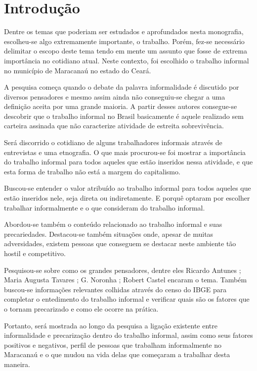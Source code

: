 \chapter{Introdução}

Dentre os temas que poderiam ser estudados e aprofundados nesta monografia, escolheu-se algo extremamente importante, o trabalho. Porém, fez-se necessário delimitar o escopo deste tema tendo em mente um assunto que fosse de extrema importância no cotidiano atual. Neste contexto, foi escolhido o trabalho informal no município de Maracanaú no estado do Ceará.

A pesquisa começa quando o debate da palavra informalidade é discutido por diversos pensadores e mesmo assim ainda não conseguiu-se chegar a uma definição aceita por uma grande maioria. A partir desses autores consegue-se descobrir que o trabalho informal no Brasil basicamente é aquele realizado sem carteira assinada que não caracterize atividade de estreita sobrevivência.

Será discorrido o cotidiano de alguns trabalhadores informais através de entrevistas e uma etnografia. O que mais procurou-se foi mostrar a importância do trabalho informal para todos aqueles que estão inseridos nessa atividade, e que esta forma de trabalho não está a margem do capitalismo.

Buscou-se entender o valor atribuído ao trabalho informal para todos aqueles que estão inseridos nele, seja direta ou indiretamente. E porquê optaram por escolher trabalhar informalmente e o que consideram do trabalho informal.

Abordou-se também o conteúdo relacionado ao trabalho informal e suas precariedades. Destacou-se também situações onde, apesar de muitas adversidades, existem pessoas que conseguem se destacar neste ambiente tão hostil e competitivo. 

Pesquisou-se sobre como os grandes pensadores, dentre eles Ricardo Antunes \cite{antunes1999sentidos}; Maria Augusta Tavares \cite{augusta}; G. Noronha \cite{noronha2003informal}; Robert Castel \cite{castel1998metamorfoses} encaram o tema. Também buscou-se informações relevantes colhidas através do censo do IBGE para completar o entedimento do trabalho informal e verificar quais são os fatores que o tornam precarizado e como ele ocorre na prática.

Portanto, será mostrada ao longo da pesquisa a ligação existente entre informalidade e precarização dentro do trabalho informal, assim como seus fatores positivos e negativos, perfil de pessoas que trabalham informalmente no Maracanaú e o que mudou na vida delas que começaram a trabalhar desta maneira.
